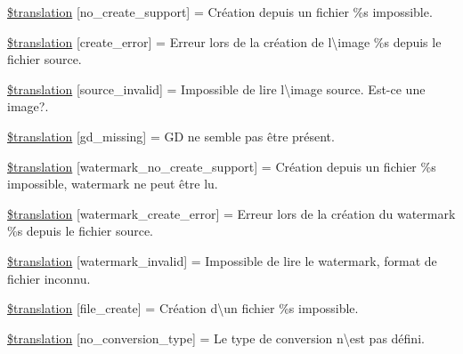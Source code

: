 \begin{DoxyCompactItemize}
\item 
\hyperlink{class_8upload_8fr___f_r_8php_a346dfd1ade29f583dd20d345c436859f}{\$translation} \mbox{[}\textquotesingle{}no\+\_\+create\+\_\+support\textquotesingle{}\mbox{]} = \textquotesingle{}Création depuis un fichier \%s impossible.\textquotesingle{}
\item 
\hyperlink{class_8upload_8fr___f_r_8php_a53013ce9255c4e1849098ddd9fdb2b3f}{\$translation} \mbox{[}\textquotesingle{}create\+\_\+error\textquotesingle{}\mbox{]} = \textquotesingle{}Erreur lors de la création de l\textbackslash{}\textquotesingle{}image \%s depuis le fichier source.\textquotesingle{}
\item 
\hyperlink{class_8upload_8fr___f_r_8php_a6ab0a660b457eaf2d3434b225449fdd6}{\$translation} \mbox{[}\textquotesingle{}source\+\_\+invalid\textquotesingle{}\mbox{]} = \textquotesingle{}Impossible de lire l\textbackslash{}\textquotesingle{}image source. Est-\/ce une image?.\textquotesingle{}
\item 
\hyperlink{class_8upload_8fr___f_r_8php_a7f3dfcc0db4bbc0f2e7210c439798e56}{\$translation} \mbox{[}\textquotesingle{}gd\+\_\+missing\textquotesingle{}\mbox{]} = \textquotesingle{}G\+D ne semble pas être présent.\textquotesingle{}
\item 
\hyperlink{class_8upload_8fr___f_r_8php_a82d5853430ab72dc1f9799ec36144cc6}{\$translation} \mbox{[}\textquotesingle{}watermark\+\_\+no\+\_\+create\+\_\+support\textquotesingle{}\mbox{]} = \textquotesingle{}Création depuis un fichier \%s impossible, watermark ne peut être lu.\textquotesingle{}
\item 
\hyperlink{class_8upload_8fr___f_r_8php_aabca0b65dadbc6184415c16375f284ca}{\$translation} \mbox{[}\textquotesingle{}watermark\+\_\+create\+\_\+error\textquotesingle{}\mbox{]} = \textquotesingle{}Erreur lors de la création du watermark \%s depuis le fichier source.\textquotesingle{}
\item 
\hyperlink{class_8upload_8fr___f_r_8php_ac336e7a5701e47ba4a05e9e498a3cc44}{\$translation} \mbox{[}\textquotesingle{}watermark\+\_\+invalid\textquotesingle{}\mbox{]} = \textquotesingle{}Impossible de lire le watermark, format de fichier inconnu.\textquotesingle{}
\item 
\hyperlink{class_8upload_8fr___f_r_8php_a1ecb4673e4fb69e06b3f20b65cecf30a}{\$translation} \mbox{[}\textquotesingle{}file\+\_\+create\textquotesingle{}\mbox{]} = \textquotesingle{}Création d\textbackslash{}\textquotesingle{}un fichier \%s impossible.\textquotesingle{}
\item 
\hyperlink{class_8upload_8fr___f_r_8php_a4712d7ec28e9a7f17eb3338af2358363}{\$translation} \mbox{[}\textquotesingle{}no\+\_\+conversion\+\_\+type\textquotesingle{}\mbox{]} = \textquotesingle{}Le type de conversion n\textbackslash{}\textquotesingle{}est pas défini.\textquotesingle{}

\end{DoxyCompactItemize}
